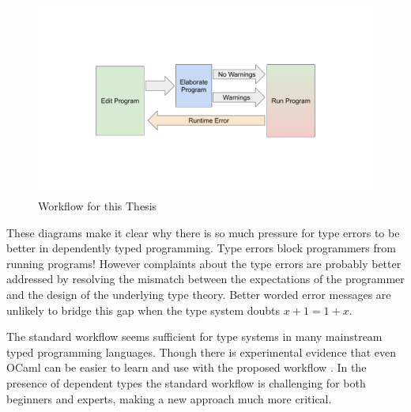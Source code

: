 \begin{figure}
\includegraphics[width=5in]{1_intro/fig/new-workflow.pdf}

\caption{Workflow for this Thesis}
\label{fig:intro-thesis-workflow}
\end{figure}

These diagrams make it clear why there is so much pressure for type errors to be better in dependently typed programming\cite{eremondi2019framework}.
Type errors block programmers from running programs! However complaints about the type errors are probably better addressed by resolving the mismatch between the expectations of the programmer and the design of the underlying type theory.
Better worded error messages are unlikely to bridge this gap when the type system doubts $x+1=1+x$.

The standard workflow seems sufficient for type systems in many mainstream typed programming languages.
Though there is experimental evidence that even OCaml can be easier to learn and use with the proposed workflow \cite{10.1145/2951913.2951915}.
In the presence of dependent types the standard workflow is challenging for both beginners and experts, making a new approach much more critical.


